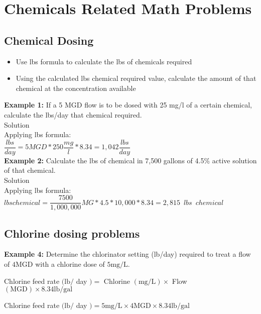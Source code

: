 \section*{Chemicals Related Math Problems}
\subsection*{Chemical Dosing}

\begin{itemize}
\item Use lbs formula to calculate the lbs of chemicals required\\
\item Using the calculated lbs chemical required value, calculate the amount of that chemical at the concentration available
\end{itemize}

\textbf{Example 1:} If a 5 MGD flow is to be dosed with 25 mg/l of a certain chemical, calculate the lbs/day that chemical required.\\

Solution\\

Applying lbs formula:\\
$\dfrac{lbs}{day}=5 MGD *250\dfrac{mg}{l}*8.34 = \boxed{1,042\dfrac{lbs}{day}}$
\\
\vspace{6pt}
\textbf{Example 2:} Calculate the lbs of chemical in 7,500 gallons of 4.5\% active solution of that chemical.\\
Solution\\
Applying lbs formula:\\
$lbs chemical = \dfrac{7500}{1,000,000}MG * 4.5*10,000 *8.34 = \boxed{2,815 \enspace lbs \enspace chemical}$\\

\subsection*{Chlorine dosing problems}
\textbf{Example 4:} Determine the chlorinator setting (lb/day) required to treat a flow of $4 \mathrm{MGD}$ with a chlorine dose of $5 \mathrm{mg} / \mathrm{L}$.

Chlorine feed rate $(\mathrm{lb} /$ day $)=$ Chlorine $(\mathrm{mg} / \mathrm{L}) \times$ Flow $(\mathrm{MGD}) \times 8.34 \mathrm{lb} / \mathrm{gal}$

Chlorine feed rate $(\mathrm{lb} /$ day $)=5 \mathrm{mg} / \mathrm{L} \times 4 \mathrm{MGD} \times 8.34 \mathrm{lb} / \mathrm{gal}$

